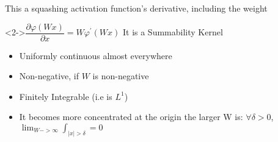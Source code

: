 \documentclass[dvipsnames,handout]{beamer}
\begin{document}
\begin{frame}{This a squashing activation function's derivative, including the weight}
	\begin{block}<2->{$\dfrac{\partial\varphi(Wx)}{\partial x}=W\varphi^\prime(Wx)$ \hfill It is a Summability Kernel}
		\begin{itemize}
			\item Uniformly continuous almost everywhere
			\item Non-negative, if $W$ is non-negative
			\item Finitely Integrable (i.e is $L^1$)
			\item It becomes more concentrated at the origin the larger W is: $\forall \delta>0$, $\displaystyle\lim_{W->\infty} \int_{|x|>\delta} = 0$
		\end{itemize}
		
	\end{block}
	
	
	\begin{columns}[onlytextwidth]
		\begin{column}{0.33\textwidth}
			\centering
		\end{column}
		
		
		\begin{column}{0.33\textwidth}
			\centering
		\end{column}
		
		
		\begin{column}{0.33\textwidth}
			\centering
		\end{column}	
	\end{columns}	
\end{frame}
\end{document}
